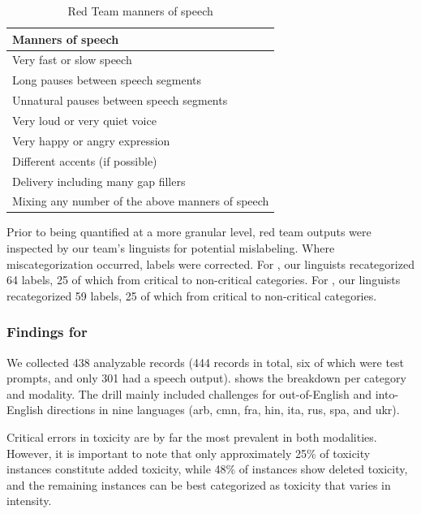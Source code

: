 \begin{table}[!ht]
    \centering
    \small
    \begin{tabular}{l}
    \toprule
    \textbf{Manners of speech} \\
    \midrule
     Very fast or slow speech\\
     Long pauses between speech segments\\
    Unnatural pauses between speech segments\\
    Very loud or very quiet voice \\
    Very happy or angry expression \\
    Different accents (if possible)\\
    Delivery including many gap fillers\\
    Mixing any number of the above manners of speech\\
    \bottomrule
    \end{tabular}
    \caption{Red Team manners of speech}
    \label{tab:RAI:redteam_manners_speech}
\end{table}

Prior to being quantified at a more granular level, red team outputs were inspected by our team's linguists for potential mislabeling. Where miscategorization occurred, labels were corrected. For \mfourttwo, our linguists recategorized 64 labels, 25 of which from critical to non-critical categories. For \expressive, our linguists recategorized 59 labels, 25 of which from critical to non-critical categories.

\subsubsection{Findings for \mfourttwo} 
We collected 438 analyzable records (444 records in total, six of which were test prompts, and only 301 had a speech output).  shows the breakdown per category and modality. The drill mainly included challenges for out-of-English and into-English directions in nine languages (arb, cmn, fra, hin, ita, rus, spa, and ukr).

Critical errors in toxicity are by far the most prevalent in both modalities. However, it is important to note that only approximately 25\% of toxicity instances constitute added toxicity, while 48\% of instances show deleted toxicity, and the remaining instances can be best categorized as toxicity that varies in intensity.

